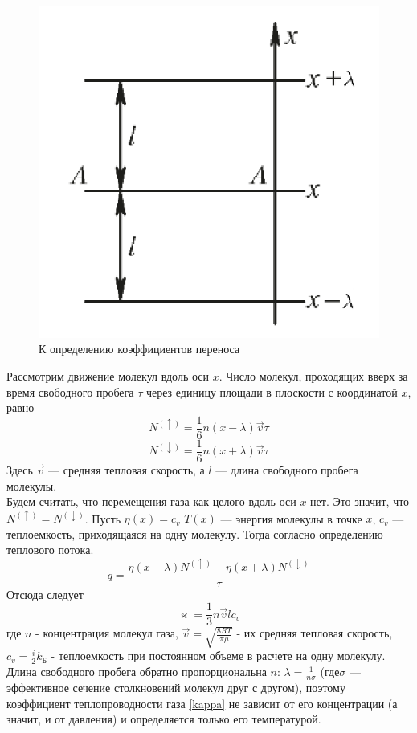 \documentclass[12pt]{article}
\begin{document}
        \begin{figure}[H]
            \centering
            \includegraphics[width=0.4\linewidth]{furie_image.png}
            \caption{К определению коэффициентов переноса}
            \label{fig:mpr}
        \end{figure}
        Рассмотрим движение молекул вдоль оси $x$. Число молекул, проходящих вверх за время свободного пробега $\tau$ через
        единицу площади в плоскости с координатой $x$, равно
        \[ N^{(\uparrow)} = \frac{1}{6}n(x-\lambda) \vec{v} \tau \]
        \[ N^{(\downarrow)} = \frac{1}{6}n(x+\lambda) \vec{v} \tau \]
        Здесь $\vec{v}$ — средняя тепловая скорость, а $l$ — длина свободного пробега молекулы.\\
        Будем считать, что перемещения газа как целого вдоль оси $x$ нет. Это значит, что $N^{(\uparrow)} =  N^{(\downarrow)}$.
        Пусть $\eta(x) = c_v$ $T(x)$ — энергия молекулы в точке $x$, $c_v$ — теплоемкость, приходящаяся на одну молекулу.
        Тогда согласно определению теплового потока.
        \[
            q = \frac{\eta(x-\lambda)N^{(\uparrow)} - \eta(x+\lambda)N^{(\downarrow)}}{\tau}
        \]
        Отсюда следует
        \begin{equation}\label{kappa}
            \varkappa = \frac{1}{3} n \vec{v}lc_v
        \end{equation}
        где $n$ - концентрация молекул газа, $\vec{v} = \sqrt{\frac{8RT}{\pi\mu}}$ - их средняя тепловая скорость,
        $c_v = \frac{i}{2}k_{\text{Б}}$ - теплоемкость при постоянном объеме в расчете на одну молекулу.\\
        Длина свободного пробега обратно пропорциональна $n$: $\lambda = \frac{1}{n\sigma}$ (где$\sigma$ — эффективное
        сечение столкновений молекул друг с другом), поэтому коэффициент теплопроводности газа \ref{kappa} не зависит от его
        концентрации (а значит, и от давления) и определяется только его температурой.
\end{document}
